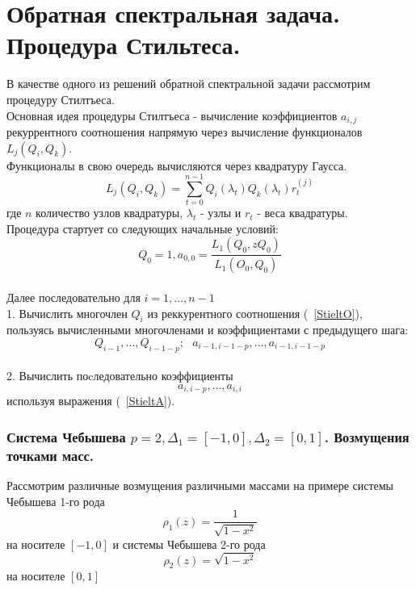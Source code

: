 \documentclass{report}
\begin{document}
\chapter {Обратная спектральная задача. Процедура Стильтеса.}
В качестве одного из решений
обратной спектральной задачи рассмотрим процедуру
Стилтъеса. \\
Основная идея процедуры Стилтъеса - вычисление коэффициентов $a_{i,j}$ рекуррентного соотношения напрямую через вычисление функционалов $L_j(Q_i,Q_k)$. \\
Функционалы в свою очередь вычисляются через квадратуру Гаусса.
\begin{equation}
L_j(Q_i,Q_k)=\sum\limits_{t=0}^{n-1}{Q_i(\lambda_{t})Q_k(\lambda_{t})r_{t}^{(j)}}
\end{equation}
где $n$ количество узлов квадратуры, $\lambda_t$ - узлы и $r_{t}$
- веса квадратуры.\\
Процедура стартует со следующих начальные условий:
$$Q_0=1, a_{0,0}=\frac{\displaystyle{L_1(Q_0,zQ_0)}}{\displaystyle{L_1(O_0,Q_0)}}$$ \\
Далее последовательно для $i=1,\ldots,n-1$ \\
1. Вычислить многочлен $Q_i$ из реккурентного соотношения (~\ref{StieltO}), пользуясь вычисленными многочленами и коэффициентами с предыдущего шага: 
$$Q_{i-1}, \ldots, Q_{i-1-p}; \mbox{    } a_{i-1,i-1-p}, \ldots,a_{i-1, i-1-p}$$  \\ 
2. Вычислить поcледовательно коэффициенты 
$$a_{i,i-p}, \ldots, a_{i,i}$$ используя выражения (~\ref{StieltA}).\\
\newpage
\subsection {Система Чебышева $p=2, \Delta_1=[-1,0], \Delta_2=[0,1]$. Возмущения точками масс.}
Рассмотрим различные возмущения различными массами на примере 
системы Чебышева 1-го рода $$\rho_1(z)=\displaystyle\frac{1}{\sqrt{1-x^2}}$$ на носителе $[-1,0]$ и системы Чебышева 2-го рода $$\rho_2(z)=\sqrt{1-x^2}$$ на носителе $[0,1]$ \\
\end{document}
